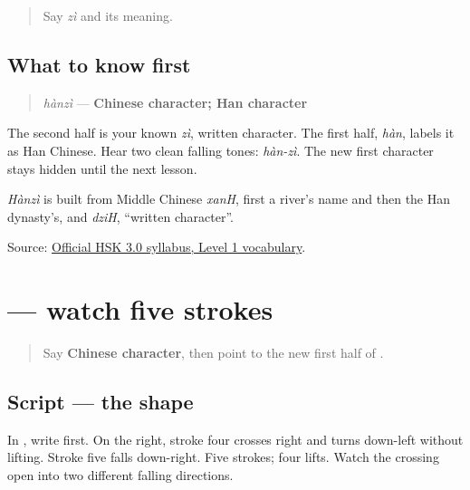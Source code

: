 \label{lesson:ZH-C16-hear-hanzi}



\begin{quote}
Say \emph{zì} and its meaning.
\end{quote}

\subsection*{What to know first}
\begin{quote}
\emph{hànzì} — \textbf{Chinese character; Han character}
\end{quote}

The second half is your known \emph{zì}, written character. The first half, \emph{hàn}, labels it as Han Chinese. Hear two clean falling tones: \emph{hàn-zì}. The new first character stays hidden until the next lesson.

\emph{Hànzì} is built from Middle Chinese \emph{xanH}, first a river's name and then the Han dynasty's, and \emph{dziH}, \textquotedblleft{}written character\textquotedblright{}.

\begin{tcolorbox}[breakable,colback=teal!4,colframe=teal!35!black,title={Before you move on}]
Source: \href{https://hsk.cn-bj.ufileos.com/3.0/\%E6\%96\%B0\%E7\%89\%88HSK\%E8\%80\%83\%E8\%AF\%95\%E5\%A4\%A7\%E7\%BA\%B21219.pdf}{Official HSK 3.0 syllabus, Level 1 vocabulary}.
\end{tcolorbox}
\section[\texorpdfstring{\zh{汉} (hàn)}{汉 (hàn)}]{ — watch five strokes}

\label{lesson:ZH-W16-han-observe}



\begin{quote}
Say \textbf{Chinese character}, then point to the new first half of .
\end{quote}

\subsection*{Script — the shape}

In \textbf{}, write  first. On the right, stroke four crosses right and turns down-left without lifting. Stroke five falls down-right. Five strokes; four lifts. Watch the crossing open into two different falling directions.

